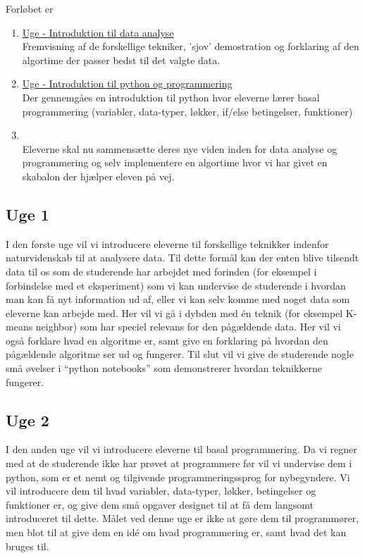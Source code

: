 \documentclass[11pt]{article}
\begin{document}
    Forløbet er
    \begin{enumerate}
        \item \underline{Uge - Introduktion til data analyse} ~ \\
        Fremvisning af de forskellige tekniker, 'sjov' demostration og forklaring af den
        algortime der passer bedst til det valgte data.

        \item \underline{Uge - Introduktion til python og programmering} ~ \\
        Der gennemgåes en introduktion til python hvor eleverne lærer basal programmering
        (variabler, data-typer, løkker, if/else betingelser, funktioner)

        \item {} ~ \\
        Eleverne skal nu sammensætte deres nye viden inden for data analyse og programmering
        og selv implementere en algortime hvor vi har givet en skabalon der hjælper
        eleven på vej.
    \end{enumerate}

    \subsection*{Uge 1}
        I den første uge vil vi introducere eleverne til forskellige teknikker
        indenfor naturvidenskab til at analysere data. Til dette formål kan der
        enten blive tilsendt data til os som de studerende har arbejdet med forinden
        (for eksempel i forbindelse med et eksperiment) som vi kan undervise de
        studerende i hvordan man kan få nyt information ud af,
        eller vi kan selv komme med noget data som eleverne kan arbejde med.
        Her vil vi gå i dybden med én teknik (for eksempel K-means neighbor)
        som har speciel relevans for den pågældende data. Her vil vi også forklare
        hvad en algoritme er, samt give en forklaring på hvordan den
        pågældende algoritme ser ud og fungerer. Til slut vil vi give de
        studerende nogle små øvelser i ``python notebooks'' som demonstrerer
        hvordan teknikkerne fungerer.

    \subsection*{Uge 2}
        I den anden uge vil vi introducere eleverne til basal programmering. Da
        vi regner med at de studerende ikke har prøvet at programmere før
        vil vi undervise dem i python, som er et nemt og tilgivende
        programmeringssprog for nybegyndere. Vi vil introducere dem til hvad
        variabler, data-typer, løkker, betingelser og funktioner er, og give
        dem små opgaver designet til at få dem langsomt introduceret til
        dette. Målet ved denne uge er ikke at gøre dem til
        programmører, men blot til at give dem en idé om hvad programmering er,
        samt hvad det kan bruges til.
\end{document}
